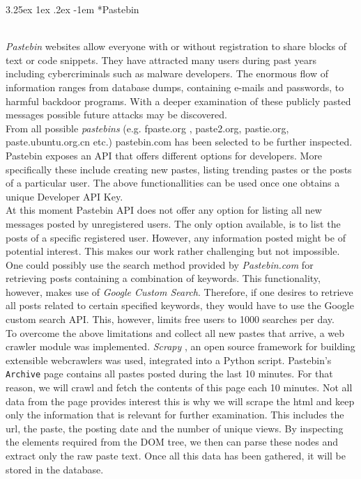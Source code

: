 \documentclass[12pt]{article}
\makeatletter
\renewcommand\paragraph{\@startsection{paragraph}{5}{\z@}%
  {3.25ex \@plus1ex \@minus.2ex}%
  {-1em}%
  {\normalfont\normalsize\bfseries}}
\makeatother
\begin{document}
\paragraph*{Pastebin}
\hfill \break
\\
\textit{Pastebin} websites \cite{fpaste} \cite{pastebin} allow everyone with or without registration to share blocks of text or code snippets. They have attracted many users during past years including cybercriminals such as malware developers\cite{pastebin-magazine}. The enormous flow of information ranges from database dumps, containing e-mails and passwords, to harmful backdoor programs. With a deeper examination of these publicly pasted messages possible future attacks may be discovered.\\
\hfill \break
From all possible \textit{pastebins} (e.g. fpaste.org \cite{fpaste}, paste2.org, pastie.org\cite{pastebin-pastie}, 
paste.ubuntu.org.cn \cite{pastebin-ubuntu} etc.) pastebin.com \cite{pastebin} has been selected to be further inspected.
\hfill \break
\\
Pastebin exposes an API that offers different options for developers. More specifically these include creating new pastes, listing trending pastes or the posts of a particular user. The above functionallities can be used once one obtains a unique Developer API Key. 
\hfill \break
\\
At this moment Pastebin API \cite{pastebin} does not offer any option for listing all new messages posted by unregistered users. The only option available, is to list the posts of a specific registered user. However, any information posted might be of potential interest. 
This makes our work rather challenging but not impossible.  
\hfill \break
\\
One could possibly use the search method provided by \textit{Pastebin.com} for retrieving posts containing a combination of keywords.
This functionality, however, makes use of \textit{Google Custom Search}. Therefore, if one desires to retrieve all posts related to certain specified keywords, they would have to use the Google custom search API. This, however, limits free users to 1000 searches per day. 
\hfill \break
\\
To overcome the above limitations and collect all new pastes that arrive, a web crawler module was implemented. \textit{Scrapy} \cite{scrapy}, an open source framework for building extensible webcrawlers was used, integrated into a Python script. Pastebin's \texttt{Archive} page contains all pastes posted during the last 10 minutes. For that reason, we will crawl and fetch the contents of this page each 10 minutes. Not all data from the page provides interest this is why we will scrape the html and keep only the information that is relevant for further examination. This includes the url, the paste, the posting date and the number of unique views. By inspecting the elements required from the DOM tree, we then can parse these nodes and extract only the raw paste text. Once all this data has been gathered, it will be stored in the database.
\end{document}
